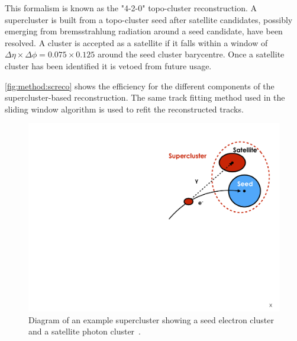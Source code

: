 This formalism is known as the "4-2-0" topo-cluster reconstruction. A supercluster is built from a topo-cluster seed after satellite candidates, possibly emerging from bremsstrahlung radiation around a seed candidate, have been resolved. A cluster is accepted as a satellite if it falls within a window of $\Delta\eta \times \Delta\phi = 0.075 \times 0.125$ around the seed cluster barycentre. Once a satellite cluster has been identified it is vetoed from future usage. 

\cref{fig:method:screco} shows the efficiency for the different components of the supercluster-based reconstruction. The same track fitting method used in the sliding window algorithm is used to refit the reconstructed tracks.
\begin{figure}[h]
    \centering
    \includegraphics[width=\mediumfigwidth]{images/topo-cluster.pdf}
    \caption[Diagram of an example supercluster showing a seed electron cluster and a satellite photon cluster.]{Diagram of an example supercluster showing a seed electron cluster and a satellite photon cluster~\cite{ATL-PHYS-PUB-2017-022}.}
    \label{fig:method:superclusterscheme}
\end{figure}
